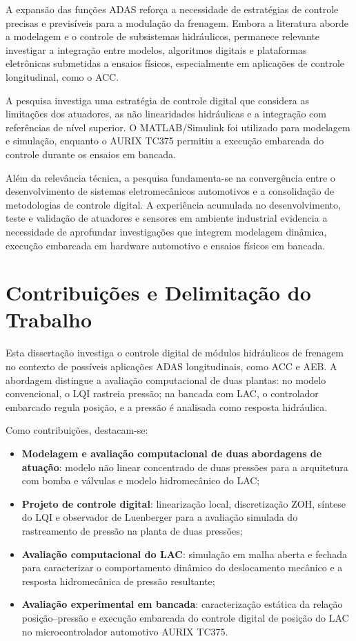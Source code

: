 A expansão das funções ADAS reforça a necessidade de estratégias de controle precisas e previsíveis para a modulação da frenagem. Embora a literatura aborde a modelagem e o controle de subsistemas hidráulicos, permanece relevante investigar a integração entre modelos, algoritmos digitais e plataformas eletrônicas submetidas a ensaios físicos, especialmente em aplicações de controle longitudinal, como o ACC.

A pesquisa investiga uma estratégia de controle digital que considera as limitações dos atuadores, as não linearidades hidráulicas e a integração com referências de nível superior. O MATLAB/Simulink foi utilizado para modelagem e simulação, enquanto o AURIX TC375 permitiu a execução embarcada do controle durante os ensaios em bancada.

Além da relevância técnica, a pesquisa fundamenta-se na convergência entre o desenvolvimento de sistemas eletromecânicos automotivos e a consolidação de metodologias de controle digital. A experiência acumulada no desenvolvimento, teste e validação de atuadores e sensores em ambiente industrial evidencia a necessidade de aprofundar investigações que integrem modelagem dinâmica, execução embarcada em hardware automotivo e ensaios físicos em bancada.

\section{Contribuições e Delimitação do Trabalho}
\label{sec:introducao-contribuicoes}

Esta dissertação investiga o controle digital de módulos hidráulicos de frenagem no contexto de possíveis aplicações ADAS longitudinais, como \gls{ACC} e \gls{AEB}. A abordagem distingue a avaliação computacional de duas plantas: no modelo convencional, o LQI rastreia pressão; na bancada com LAC, o controlador embarcado regula posição, e a pressão é analisada como resposta hidráulica.

Como contribuições, destacam-se:
\begin{itemize}
    \item \textbf{Modelagem e avaliação computacional de duas abordagens de atuação}: modelo não linear concentrado de duas pressões para a arquitetura com bomba e válvulas e modelo hidromecânico do LAC;
    \item \textbf{Projeto de controle digital}: linearização local, discretização ZOH, síntese do LQI e observador de Luenberger para a avaliação simulada do rastreamento de pressão na planta de duas pressões;
    \item \textbf{Avaliação computacional do LAC}: simulação em malha aberta e fechada para caracterizar o comportamento dinâmico do deslocamento mecânico e a resposta hidromecânica de pressão resultante;
    \item \textbf{Avaliação experimental em bancada}: caracterização estática da relação posição--pressão e execução embarcada do controle digital de posição do LAC no microcontrolador automotivo AURIX TC375.
\end{itemize}

